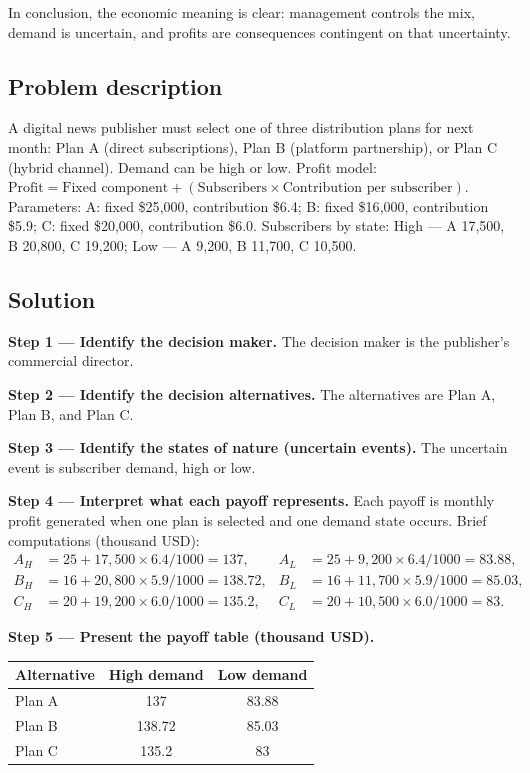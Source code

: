 \begin{ExamProblems}
		In conclusion, the economic meaning is clear: management controls the mix, demand is uncertain, and profits are consequences contingent on that uncertainty.
		
		\item
		\subsection*{Problem description}
		A digital news publisher must select one of three distribution plans for next month:
		Plan A (direct subscriptions), Plan B (platform partnership), or Plan C (hybrid channel).
		Demand can be high or low.
		Profit model: \(\text{Profit}=\text{Fixed component}+(\text{Subscribers}\times\text{Contribution per subscriber})\).
		Parameters:
		A: fixed \$25{,}000, contribution \$6.4;
		B: fixed \$16{,}000, contribution \$5.9;
		C: fixed \$20{,}000, contribution \$6.0.
		Subscribers by state:
		High --- A 17{,}500, B 20{,}800, C 19{,}200;
		Low --- A 9{,}200, B 11{,}700, C 10{,}500.
		
		\subsection*{Solution}
		\textbf{Step 1 --- Identify the decision maker.} The decision maker is the publisher's commercial director.
		
		\textbf{Step 2 --- Identify the decision alternatives.} The alternatives are Plan A, Plan B, and Plan C.
		
		\textbf{Step 3 --- Identify the states of nature (uncertain events).} The uncertain event is subscriber demand, high or low.
		
		\textbf{Step 4 --- Interpret what each payoff represents.} Each payoff is monthly profit generated when one plan is selected and one demand state occurs. Brief computations (thousand USD):
		\[
		\begin{aligned}
		A_H&=25+17{,}500\times6.4/1000=137, & A_L&=25+9{,}200\times6.4/1000=83.88,\\
		B_H&=16+20{,}800\times5.9/1000=138.72, & B_L&=16+11{,}700\times5.9/1000=85.03,\\
		C_H&=20+19{,}200\times6.0/1000=135.2, & C_L&=20+10{,}500\times6.0/1000=83.
		\end{aligned}
		\]
		
		\textbf{Step 5 --- Present the payoff table (thousand USD).}
		\begin{center}
			\begin{tabular}{l c c}
				\toprule
				Alternative & High demand & Low demand \\
				\midrule
				Plan A & 137 & 83.88 \\
				Plan B & 138.72 & 85.03 \\
				Plan C & 135.2 & 83 \\
				\bottomrule
			\end{tabular}
		\end{center}
		

\end{ExamProblems}
